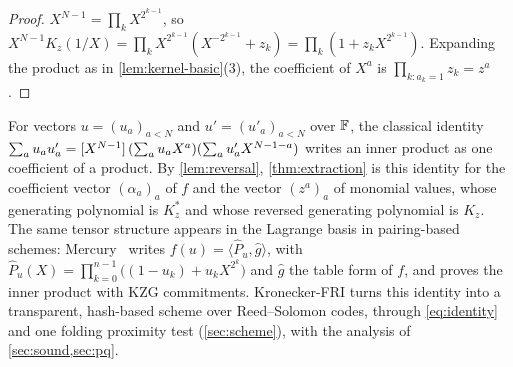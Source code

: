\begin{proof}
$X^{N-1} = \prod_k X^{2^{k-1}}$, so $X^{N-1}K_z(1/X) = \prod_k X^{2^{k-1}}(X^{-2^{k-1}} + z_k) = \prod_k (1 + z_k X^{2^{k-1}})$. Expanding the product as in \cref{lem:kernel-basic}(3), the coefficient of $X^a$ is $\prod_{k : a_k = 1} z_k = z^a$.
\end{proof}

For vectors $u = (u_a)_{a<N}$ and $u' = (u'_a)_{a<N}$ over $\mathbb{F}$, the classical identity $\sum_a u_a u'_a = [X^{N-1}]\,(\sum_a u_a X^a)(\sum_a u'_a X^{N-1-a})$ writes an inner product as one coefficient of a product.
By \cref{lem:reversal}, \cref{thm:extraction} is this identity for the coefficient vector $(\alpha_a)_a$ of $f$ and the vector $(z^a)_a$ of monomial values, whose generating polynomial is $K^\ast_z$ and whose reversed generating polynomial is $K_z$.
The same tensor structure appears in the Lagrange basis in pairing-based schemes: Mercury~\cite{EG25} writes $f(u) = \langle \hat P_u, \hat g \rangle$, with $\hat P_u(X) = \prod_{k=0}^{n-1}\bigl((1-u_k) + u_k X^{2^k}\bigr)$ and $\hat g$ the table form of $f$, and proves the inner product with KZG commitments.
Kronecker-FRI turns this identity into a transparent, hash-based scheme over Reed--Solomon codes, through \eqref{eq:identity} and one folding proximity test (\cref{sec:scheme}), with the analysis of \cref{sec:sound,sec:pq}.
